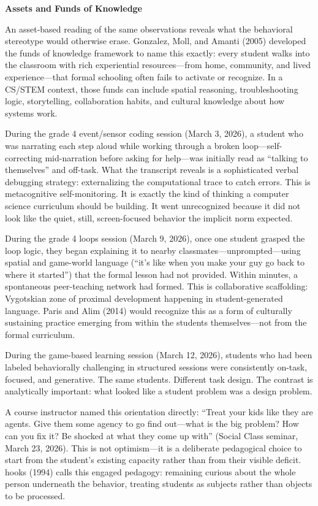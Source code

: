 \documentclass[12pt]{article}
\newcommand{\apaheading}[1]{\begin{center}\textbf{#1}\end{center}}
\begin{document}
\apaheading{Assets and Funds of Knowledge}

An asset-based reading of the same observations reveals what the behavioral stereotype would otherwise erase. Gonzalez, Moll, and Amanti (2005) developed the funds of knowledge framework to name this exactly: every student walks into the classroom with rich experiential resources---from home, community, and lived experience---that formal schooling often fails to activate or recognize. In a CS/STEM context, those funds can include spatial reasoning, troubleshooting logic, storytelling, collaboration habits, and cultural knowledge about how systems work.

During the grade 4 event/sensor coding session (March 3, 2026), a student who was narrating each step aloud while working through a broken loop---self-correcting mid-narration before asking for help---was initially read as ``talking to themselves'' and off-task. What the transcript reveals is a sophisticated verbal debugging strategy: externalizing the computational trace to catch errors. This is metacognitive self-monitoring. It is exactly the kind of thinking a computer science curriculum should be building. It went unrecognized because it did not look like the quiet, still, screen-focused behavior the implicit norm expected.

During the grade 4 loops session (March 9, 2026), once one student grasped the loop logic, they began explaining it to nearby classmates---unprompted---using spatial and game-world language (``it's like when you make your guy go back to where it started'') that the formal lesson had not provided. Within minutes, a spontaneous peer-teaching network had formed. This is collaborative scaffolding: Vygotskian zone of proximal development happening in student-generated language. Paris and Alim (2014) would recognize this as a form of culturally sustaining practice emerging from within the students themselves---not from the formal curriculum.

During the game-based learning session (March 12, 2026), students who had been labeled behaviorally challenging in structured sessions were consistently on-task, focused, and generative. The same students. Different task design. The contrast is analytically important: what looked like a student problem was a design problem.

A course instructor named this orientation directly: ``Treat your kids like they are agents. Give them some agency to go find out---what is the big problem? How can you fix it? Be shocked at what they come up with'' (Social Class seminar, March 23, 2026). This is not optimism---it is a deliberate pedagogical choice to start from the student's existing capacity rather than from their visible deficit. hooks (1994) calls this engaged pedagogy: remaining curious about the whole person underneath the behavior, treating students as subjects rather than objects to be processed.
\end{document}
